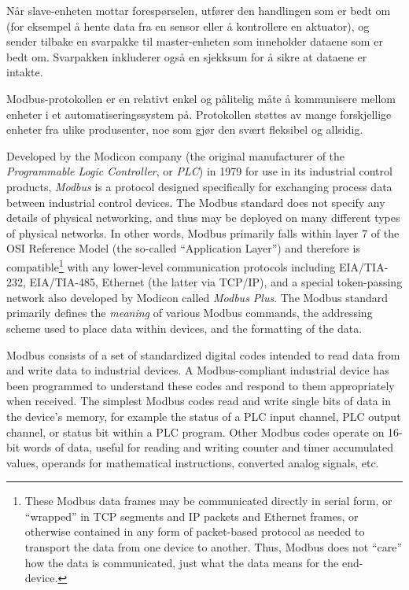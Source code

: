 Når slave-enheten mottar forespørselen, utfører den handlingen som er bedt om (for eksempel å hente data fra en sensor eller å kontrollere en aktuator), og sender tilbake en svarpakke til master-enheten som inneholder dataene som er bedt om. Svarpakken inkluderer også en sjekksum for å sikre at dataene er intakte.

Modbus-protokollen er en relativt enkel og pålitelig måte å kommunisere mellom enheter i et automatiseringssystem på. Protokollen støttes av mange forskjellige enheter fra ulike produsenter, noe som gjør den svært fleksibel og allsidig.


Developed by the Modicon company (the original manufacturer of the \textit{Programmable Logic Controller}, or \textit{PLC}) in 1979 for use in its industrial control products, \textit{Modbus} is a protocol designed specifically for exchanging process data between industrial control devices.  The Modbus standard does not specify any details of physical networking, and thus may be deployed on many different types of physical networks.  In other words, Modbus primarily falls within layer 7 of the OSI Reference Model (the so-called ``Application Layer'') and therefore is compatible\footnote{These Modbus data frames may be communicated directly in serial form, or ``wrapped'' in TCP segments and IP packets and Ethernet frames, or otherwise contained in any form of packet-based protocol as needed to transport the data from one device to another.  Thus, Modbus does not ``care'' how the data is communicated, just what the data means for the end-device.} with any lower-level communication protocols including EIA/TIA-232, EIA/TIA-485, Ethernet (the latter via TCP/IP), and a special token-passing network also developed by Modicon called \textit{Modbus Plus}.  The Modbus standard primarily defines the \textit{meaning} of various Modbus commands, the addressing scheme used to place data within devices, and the formatting of the data.                

Modbus consists of a set of standardized digital codes intended to read data from and write data to industrial devices.  A Modbus-compliant industrial device has been programmed to understand these codes and respond to them appropriately when received.  The simplest Modbus codes read and write single bits of data in the device's memory, for example the status of a PLC input channel, PLC output channel, or status bit within a PLC program.  Other Modbus codes operate on 16-bit words of data, useful for reading and writing counter and timer accumulated values, operands for mathematical instructions, converted analog signals, etc.

